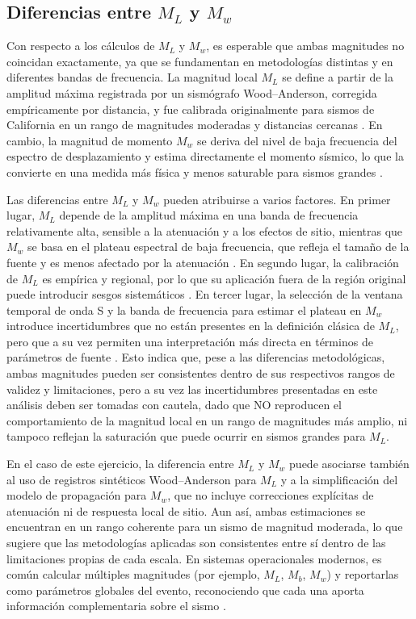 \documentclass[a4paper,12pt]{article} %
\numberwithin{equation}{section} %
\numberwithin{figure}{section} %
\begin{document}
\subsection{Diferencias entre $M_L$ y $M_w$}

Con respecto a los cálculos de $M_L$ y $M_w$, es esperable que ambas magnitudes no coincidan exactamente, ya que se fundamentan en metodologías distintas y en diferentes bandas de frecuencia. La magnitud local $M_L$ se define a partir de la amplitud máxima registrada por un sismógrafo Wood--Anderson, corregida empíricamente por distancia, y fue calibrada originalmente para sismos de California en un rango de magnitudes moderadas y distancias cercanas \cite{richter1935instrumental, wood1931new}. En cambio, la magnitud de momento $M_w$ se deriva del nivel de baja frecuencia del espectro de desplazamiento y estima directamente el momento sísmico, lo que la convierte en una medida más física y menos saturable para sismos grandes \cite{hanks1979moment, aki1980quantitative}.

Las diferencias entre $M_L$ y $M_w$ pueden atribuirse a varios factores. En primer lugar, $M_L$ depende de la amplitud máxima en una banda de frecuencia relativamente alta, sensible a la atenuación y a los efectos de sitio, mientras que $M_w$ se basa en el plateau espectral de baja frecuencia, que refleja el tamaño de la fuente y es menos afectado por la atenuación \cite{bormann2014new}. En segundo lugar, la calibración de $M_L$ es empírica y regional, por lo que su aplicación fuera de la región original puede introducir sesgos sistemáticos \cite{richter1935instrumental}. En tercer lugar, la selección de la ventana temporal de onda S y la banda de frecuencia para estimar el plateau en $M_w$ introduce incertidumbres que no están presentes en la definición clásica de $M_L$, pero que a su vez permiten una interpretación más directa en términos de parámetros de fuente \cite{aki1980quantitative}. Esto indica que, pese a las diferencias metodológicas, ambas magnitudes pueden ser consistentes dentro de sus respectivos rangos de validez y limitaciones, pero a su vez las incertidumbres presentadas en este análisis deben ser tomadas con cautela, dado que NO reproducen el comportamiento de la magnitud local en un rango de magnitudes más amplio, ni tampoco reflejan la saturación que puede ocurrir en sismos grandes para $M_L$.

En el caso de este ejercicio, la diferencia entre $M_L$ y $M_w$ puede asociarse también al uso de registros sintéticos Wood--Anderson para $M_L$ y a la simplificación del modelo de propagación para $M_w$, que no incluye correcciones explícitas de atenuación ni de respuesta local de sitio. Aun así, ambas estimaciones se encuentran en un rango coherente para un sismo de magnitud moderada, lo que sugiere que las metodologías aplicadas son consistentes entre sí dentro de las limitaciones propias de cada escala. En sistemas operacionales modernos, es común calcular múltiples magnitudes (por ejemplo, $M_L$, $M_b$, $M_w$) y reportarlas como parámetros globales del evento, reconociendo que cada una aporta información complementaria sobre el sismo \cite{gempa2026global}.
\end{document}
